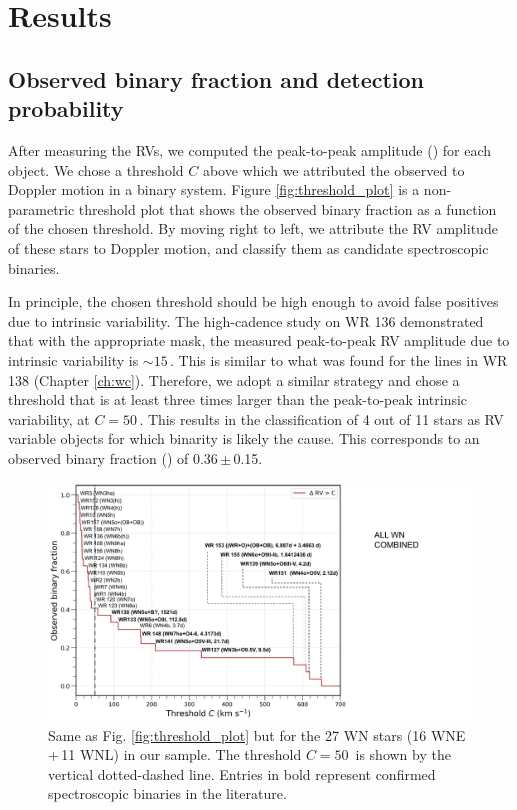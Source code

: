 
\section{Results} \label{sect:results_WNL}
\subsection{Observed binary fraction and detection probability}
After measuring the RVs, we computed the peak-to-peak amplitude (\DelRV{}) for each object. We chose a threshold $C$ above which we attributed the observed \DelRV{} to Doppler motion in a binary system. Figure \ref{fig:threshold_plot} is a non-parametric threshold plot that shows the observed binary fraction as a function of the chosen threshold. By moving right to left, we attribute the RV amplitude of these stars to Doppler motion, and classify them as candidate spectroscopic binaries. 

In principle, the chosen threshold should be high enough to avoid false positives due to intrinsic variability. The high-cadence study on WR 136 demonstrated that with the appropriate mask, the measured peak-to-peak RV amplitude due to intrinsic variability is ${\sim}15$\,\kms{}. This is similar to what was found for the \nv{} lines in WR 138 (Chapter \ref{ch:wc}). Therefore, we adopt a similar strategy and chose a threshold that is at least three times larger than the peak-to-peak intrinsic variability, at $C=50$\,\kms{}. This results in the classification of 4 out of 11 stars as RV variable objects for which binarity is likely the cause. This corresponds to an observed binary fraction (\fobsWNL{}) of 0.36\,$\pm$\,0.15. 

\begin{figure}
    \centering
    \includegraphics[width=\hsize]{chapters/WNL/image/BINFRAC_WN_1905.pdf}
    \caption{Same as Fig. \ref{fig:threshold_plot} but for the 27 WN stars (16 WNE\,+\,11 WNL) in our sample. The threshold $C=50\,$\kms{} is shown by the vertical dotted-dashed line. Entries in bold represent confirmed spectroscopic binaries in the literature.}
    \label{fig:threshold_plot_WN}
\end{figure}

